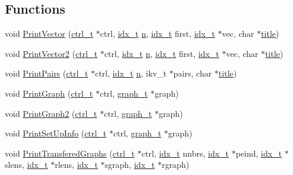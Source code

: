 \subsection*{Functions}
\begin{DoxyCompactItemize}
\item 
void \hyperlink{a00885_a43a186cb2cde8ebcf85b11b5c3ac0f6c}{Print\+Vector} (\hyperlink{a00742}{ctrl\+\_\+t} $\ast$ctrl, \hyperlink{a00876_aaa5262be3e700770163401acb0150f52}{idx\+\_\+t} \hyperlink{a00623_a781a04ab095280f838ff3eb0e51312e0}{n}, \hyperlink{a00876_aaa5262be3e700770163401acb0150f52}{idx\+\_\+t} first, \hyperlink{a00876_aaa5262be3e700770163401acb0150f52}{idx\+\_\+t} $\ast$vec, char $\ast$\hyperlink{a00617_a051e403214cb6872ad3fe4e50302a6ee}{title})
\item 
void \hyperlink{a00885_aea29acc4fefc6ddc65beff73550e3593}{Print\+Vector2} (\hyperlink{a00742}{ctrl\+\_\+t} $\ast$ctrl, \hyperlink{a00876_aaa5262be3e700770163401acb0150f52}{idx\+\_\+t} \hyperlink{a00623_a781a04ab095280f838ff3eb0e51312e0}{n}, \hyperlink{a00876_aaa5262be3e700770163401acb0150f52}{idx\+\_\+t} first, \hyperlink{a00876_aaa5262be3e700770163401acb0150f52}{idx\+\_\+t} $\ast$vec, char $\ast$\hyperlink{a00617_a051e403214cb6872ad3fe4e50302a6ee}{title})
\item 
void \hyperlink{a00885_a4e5dc2fb1cbc54ceb9e5bb5a3d2705eb}{Print\+Pairs} (\hyperlink{a00742}{ctrl\+\_\+t} $\ast$ctrl, \hyperlink{a00876_aaa5262be3e700770163401acb0150f52}{idx\+\_\+t} \hyperlink{a00623_a781a04ab095280f838ff3eb0e51312e0}{n}, ikv\+\_\+t $\ast$pairs, char $\ast$\hyperlink{a00617_a051e403214cb6872ad3fe4e50302a6ee}{title})
\item 
void \hyperlink{a00885_a26a1678e698df9936cef89e68523aff9}{Print\+Graph} (\hyperlink{a00742}{ctrl\+\_\+t} $\ast$ctrl, \hyperlink{a00734}{graph\+\_\+t} $\ast$graph)
\item 
void \hyperlink{a00885_aefc3e7d2366568c45192419c7beebd48}{Print\+Graph2} (\hyperlink{a00742}{ctrl\+\_\+t} $\ast$ctrl, \hyperlink{a00734}{graph\+\_\+t} $\ast$graph)
\item 
void \hyperlink{a00885_ac254342a49647a11cce3e8e055df0d11}{Print\+Set\+Up\+Info} (\hyperlink{a00742}{ctrl\+\_\+t} $\ast$ctrl, \hyperlink{a00734}{graph\+\_\+t} $\ast$graph)
\item 
void \hyperlink{a00885_a390f937647abe8d229490f6db3a98548}{Print\+Transfered\+Graphs} (\hyperlink{a00742}{ctrl\+\_\+t} $\ast$ctrl, \hyperlink{a00876_aaa5262be3e700770163401acb0150f52}{idx\+\_\+t} nnbrs, \hyperlink{a00876_aaa5262be3e700770163401acb0150f52}{idx\+\_\+t} $\ast$peind, \hyperlink{a00876_aaa5262be3e700770163401acb0150f52}{idx\+\_\+t} $\ast$slens, \hyperlink{a00876_aaa5262be3e700770163401acb0150f52}{idx\+\_\+t} $\ast$rlens, \hyperlink{a00876_aaa5262be3e700770163401acb0150f52}{idx\+\_\+t} $\ast$sgraph, \hyperlink{a00876_aaa5262be3e700770163401acb0150f52}{idx\+\_\+t} $\ast$rgraph)

\end{DoxyCompactItemize}
